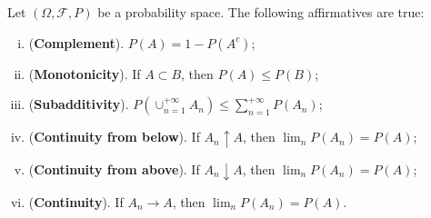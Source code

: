 \begin{proposition}
	Let $(\Omega, \mathcal F, P)$ be a probability space. The following affirmatives are true:
	\begin{enumerate}[(i)]
		\item (\textbf{Complement}). $P(A) = 1 - P(A^c)$;
		\item (\textbf{Monotonicity}). If $A \subset B$, then $P(A) \leq P(B)$;
		\item (\textbf{Subadditivity}). $P(\cup^{+\infty}_{n=1}A_n) \leq \sum^{+\infty}_{n=1}P(A_n)$;
		\item (\textbf{Continuity from below}). If $A_n \uparrow A$,
		      then $\lim_n P(A_n)=P(A)$;
		\item (\textbf{Continuity from above}). If $A_n \downarrow A$,
		      then $\lim_n P(A_n)=P(A)$;
		\item (\textbf{Continuity}). If $A_n \to A$,
		      then $\lim_n P(A_n)=P(A)$.
	\end{enumerate}
\end{proposition}
